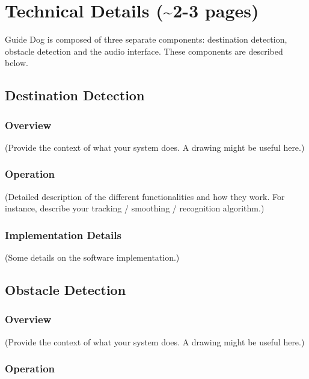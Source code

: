 \section{Technical Details (\textasciitilde 2-3 pages)}
\label{sec:technical}

Guide Dog is composed of three separate components: destination detection,
obstacle detection and the audio interface. These components are described
below.

\subsection{Destination Detection}
\label{sec:dest}

\subsubsection{Overview}
\label{sec:dest-overview}

(Provide the context of what your system does. A drawing might be useful here.)

\subsubsection{Operation}
\label{sec:dest-op}

(Detailed description of the different functionalities and how they work. For
instance, describe your tracking / smoothing / recognition algorithm.)

\subsubsection{Implementation Details}
\label{sec:dest-impl}

(Some details on the software implementation.)

\subsection{Obstacle Detection}
\label{sec:obs}

\subsubsection{Overview}
\label{sec:obs-overview}

(Provide the context of what your system does. A drawing might be useful here.)

\subsubsection{Operation}
\label{sec:obs-op}

